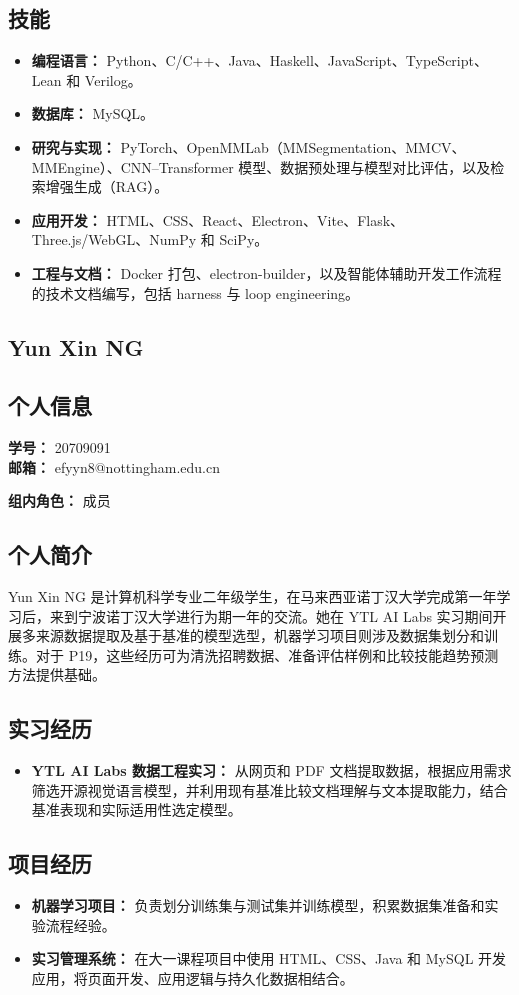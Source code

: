 \documentclass[a4paper,12pt]{article}
\newcommand{\PersonalInformation}[2]{%
  \subsection*{个人信息}
  \if\relax\detokenize{#1}\relax\else
  \noindent\textbf{学号：} #1\\
  \fi
  \textbf{邮箱：} #2\par
}
\begin{document}
\subsection*{技能}
\begin{itemize}
  \item \textbf{编程语言：} Python、C/C++、Java、Haskell、JavaScript、TypeScript、Lean 和 Verilog。
  \item \textbf{数据库：} MySQL。
  \item \textbf{研究与实现：} PyTorch、OpenMMLab（MMSegmentation、MMCV、MMEngine）、CNN--Transformer 模型、数据预处理与模型对比评估，以及检索增强生成（RAG）。
  \item \textbf{应用开发：} HTML、CSS、React、Electron、Vite、Flask、Three.js/WebGL、NumPy 和 SciPy。
  \item \textbf{工程与文档：} Docker 打包、electron-builder，以及智能体辅助开发工作流程的技术文档编写，包括 harness 与 loop engineering。
\end{itemize}

\subsection{Yun Xin NG}
\PersonalInformation{20709091}{efyyn8@nottingham.edu.cn}
\noindent\textbf{组内角色：} 成员\par

\subsection*{个人简介}
Yun Xin NG 是计算机科学专业二年级学生，在马来西亚诺丁汉大学完成第一年学习后，来到宁波诺丁汉大学进行为期一年的交流。她在 YTL AI Labs 实习期间开展多来源数据提取及基于基准的模型选型，机器学习项目则涉及数据集划分和训练。对于 P19，这些经历可为清洗招聘数据、准备评估样例和比较技能趋势预测方法提供基础。

\subsection*{实习经历}
\begin{itemize}
  \item \textbf{YTL AI Labs 数据工程实习：} 从网页和 PDF 文档提取数据，根据应用需求筛选开源视觉语言模型，并利用现有基准比较文档理解与文本提取能力，结合基准表现和实际适用性选定模型。
\end{itemize}

\subsection*{项目经历}
\begin{itemize}
  \item \textbf{机器学习项目：} 负责划分训练集与测试集并训练模型，积累数据集准备和实验流程经验。
  \item \textbf{实习管理系统：} 在大一课程项目中使用 HTML、CSS、Java 和 MySQL 开发应用，将页面开发、应用逻辑与持久化数据相结合。
\end{itemize}
\end{document}
